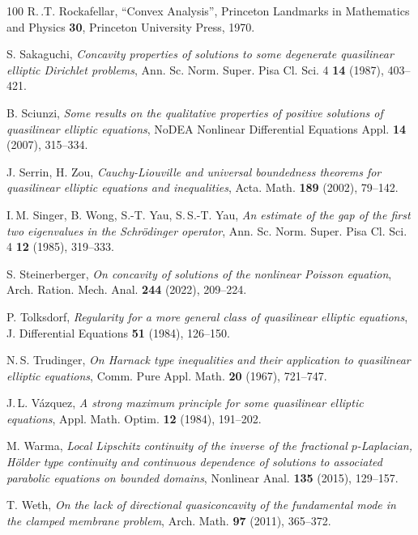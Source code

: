 \documentclass[11pt, reqno]{amsart}
\theoremstyle{definition}
\numberwithin{equation}{section}
\begin{document}
\begin{thebibliography}{100}
 R.$\,$.T. Rockafellar,
``Convex Analysis'',
Princeton Landmarks in Mathematics and Physics \textbf{30}, Princeton University Press, 1970.

 S. Sakaguchi,
\emph{Concavity properties of solutions to some degenerate quasilinear elliptic Dirichlet problems},
Ann. Sc. Norm. Super. Pisa Cl. Sci. 4 \textbf{14} (1987), %
403--421.

 B. Sciunzi,
\emph{Some results on the qualitative properties of positive solutions of quasilinear elliptic equations},
NoDEA Nonlinear Differential Equations Appl. \textbf{14} (2007), %
315--334.

 J. Serrin, H. Zou,
\emph{Cauchy-Liouville and universal boundedness theorems for quasilinear elliptic equations and inequalities},
Acta. Math. \textbf{189} (2002), 79--142.

 I.$\,$M. Singer, B. Wong, S.-T. Yau, S.$\,$S.-T. Yau,
\emph{An estimate of the gap of the first two eigenvalues in the Schrödinger operator},
Ann. Sc. Norm. Super. Pisa Cl. Sci. 4 \textbf{12} (1985), %
319--333.

 S. Steinerberger,
\emph{On concavity of solutions of the nonlinear Poisson equation},
Arch. Ration. Mech. Anal. \textbf{244} (2022), %
209--224.

 P. Tolksdorf,
\emph{Regularity for a more general class of quasilinear elliptic equations},
J. Differential Equations \textbf{51} (1984), %
126--150.

 N.$\,$S. Trudinger,
\emph{On Harnack type inequalities and their application to quasilinear elliptic equations},
Comm. Pure Appl. Math. \textbf{20} (1967), %
721--747.

 J.$\,$L. Vázquez,
\emph{A strong maximum principle for some quasilinear elliptic equations},
Appl. Math. Optim. \textbf{12} (1984), %
191--202.

 M. Warma,
\emph{Local Lipschitz continuity of the inverse of the fractional $p$-Laplacian, Hölder type continuity and continuous dependence of solutions to associated parabolic equations on bounded domains},
Nonlinear Anal. \textbf{135} (2015), %
129--157.

 T. Weth,
\emph{On the lack of directional quasiconcavity of the fundamental mode in the clamped membrane problem},
Arch. Math. \textbf{97} (2011), %
365--372.

\end{thebibliography}
\end{document}

